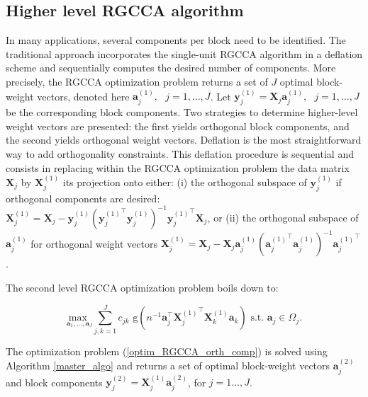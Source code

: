 \documentclass[
]{jss}
\begin{document}
\hypertarget{higher-level-rgcca-algorithm}{%
\subsection{Higher level RGCCA
algorithm}\label{higher-level-rgcca-algorithm}}

In many applications, several components per block need to be
identified. The traditional approach incorporates the single-unit RGCCA
algorithm in a deflation scheme and sequentially computes the desired
number of components. More precisely, the RGCCA optimization problem
returns a set of \(J\) optimal block-weight vectors, denoted here
\(\mathbf a_j^{(1)}, \text{ } j = 1, \ldots, J\). Let
\(\mathbf y_j^{(1)} = \mathbf X_j \mathbf a_j^{(1)}, \text{ } j = 1, \ldots, J\)
be the corresponding block components. Two strategies to determine
higher-level weight vectors are presented: the first yields orthogonal
block components, and the second yields orthogonal weight vectors.
Deflation is the most straightforward way to add orthogonality
constraints. This deflation procedure is sequential and consists in
replacing within the RGCCA optimization problem the data matrix
\(\mathbf X_j\) by \(\mathbf X_j^{(1)}\) its projection onto either: (i)
the orthogonal subspace of \(\mathbf y_j^{(1)}\) if orthogonal
components are desired:
\(\mathbf X_j^{(1)} = \mathbf X_j - \mathbf y_j^{(1)} \left( { \mathbf y_j^{(1)}}^\top \mathbf y_j^{(1)} \right)^{-1}{ \mathbf y_j^{(1)}}^\top \mathbf X_j\),
or (ii) the orthogonal subspace of \(\mathbf a_j^{(1)}\) for orthogonal
weight vectors
\(\mathbf X_j^{(1)} = \mathbf X_j - \mathbf X_j \mathbf a_j^{(1)} \left( { \mathbf a_j^{(1)}}^\top \mathbf a_j^{(1)} \right)^{-1}{ \mathbf a_j^{(1)}}^\top\).

The second level RGCCA optimization problem boils down to:

\begin{equation}
        \underset{ \mathbf a_1, \ldots, \mathbf a_J}{\text{max }} \sum_{j, k = 1}^J c_{jk} \text{ g}\left(n^{-1} \mathbf a_j^\top {\mathbf X_j^{(1)}}^\top \mathbf X_k^{(1)}  \mathbf a_k \right)
        \text{ s.t. }  \mathbf a_j \in \Omega_j.
    \label{optim_RGCCA_orth_comp}
\end{equation}

The optimization problem (\ref{optim_RGCCA_orth_comp}) is solved using
Algorithm \ref{master_algo} and returns a set of optimal block-weight
vectors \(\mathbf a_j^{(2)}\) and block components
\(\mathbf y_j^{(2)} = \mathbf X_j^{(1)} \mathbf a_j^{(2)}\), for
\(j = 1\ldots, J\).
\end{document}
